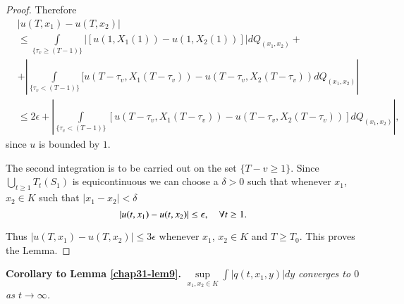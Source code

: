 \begin{proof}
Therefore
{\fontsize{10pt}{12pt}\selectfont
\begin{align*}
& |u(T,x_{1})-u(T,x_{2})|\\
& \leq\int\limits_{\{\tau_{v}\geq
    (T-1)\}}|[u(1,X_{1}(1))-u(1,X_{2}(1))]|dQ_{(x_{1},x_{2})}+\\ 
&
  +|\int\limits_{\{\tau_{v}<(T-1)\}}[u(T-\tau_{v},X_{1}(T-\tau_{v}))-u(T-\tau_{v},X_{2}(T-\tau_{v}))dQ_{(x_{1},x_{2})}|\\
& \leq 2\epsilon + |\int\limits_{\{\tau_{v}<(T-1)\}}[u(T-\tau_{v},X_{1}(T-\tau_{v}))-u(T-\tau_{v},X_{2}(T-\tau_{v}))]dQ_{(x_{1},x_{2})}|,
\end{align*}}\relax
since $u$ is bounded by $1$.

The second integration is to be carried out on the set $\{T-v\geq
1\}$. Since $\bigcup\limits_{t\geq 1}T_{t}(S_{1})$ is equicontinuous
we can choose a $\delta>0$ such that whenever $x_{1}$, $x_{2}\in K$
such that $|x_{1}-x_{2}|<\delta$
$$
|u(t,x_{1})-u(t,x_{2})|\leq \epsilon,\quad \forall t\geq 1.
$$\pageoriginale

Thus $|u(T,x_{1})-u(T,x_{2})|\leq 3\epsilon$ whenever $x_{1}$,
$x_{2}\in K$ and $T\geq T_{0}$. This proves the Lemma.
\end{proof}

\noindent
{\bf Corollary to Lemma \ref{chap31-lem9}.}
$\sup\limits_{x_{1},x_{2}\in K}\int|q(t,x_{1},y)|dy$ {\em converges to
  $0$ as $t\to \infty$.}

